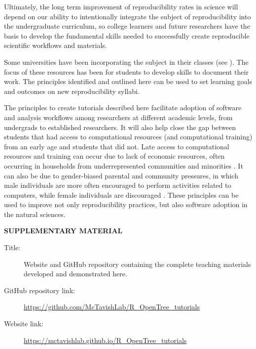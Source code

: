 \documentclass[12pt]{article}
\begin{document}
Ultimately, the long term improvement of reproducibility rates in science will depend
on our ability to intentionally integrate the subject of reproducibility into the
undergraduate curriculum, so college learners and future researchers have the
basis to develop the fundamental skills needed to successfully create reproducible
scientific workflows and materials.

Some universities have been incorporating the subject in their classes (see
\cite{uwlibraries2022, nigms2022}).
The focus of these resources has been for students to develop skills to document their work.
The principles identified and outlined here can be used to set learning goals and
outcomes on new reproducibility syllabi.

The principles to create tutorials described here facilitate adoption of software
 and analysis workflows among researchers at different academic levels, from undergrads
  to established researchers.
It will also help close the gap between students that had access to computational
resources (and computational training) from an early age and students that did not.
Late access to computational resources and training can occur due to lack of
economic resources, often occurring in households from underrepresented communities
and minorities \citep{REFERENCE-NEEDED}.
It can also be due to gender-biased parental and community pressures,
in which male individuals are more often encouraged to perform activities related to computers,
while female individuals are discouraged \citep{REFERENCE-NEEDED}.
These principles can be used to improve not only reproducibility practices,
 but also software adoption in the natural sciences.


\bigskip
\begin{center}
{\large\bf SUPPLEMENTARY MATERIAL}
\end{center}

\begin{description}

\item[Title:] Website and GitHub repository containing the complete teaching materials developed and demonstrated here.

\item[GitHub repository link:] \url{https://github.com/McTavishLab/R_OpenTree_tutorials}

\item[Website link:] \url{https://mctavishlab.github.io/R_OpenTree_tutorials}

\end{description}


\end{document}
